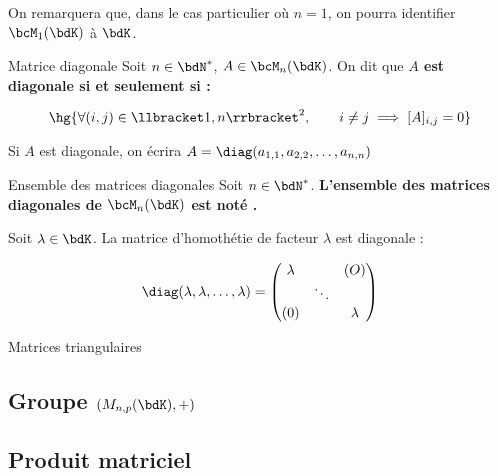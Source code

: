 \documentclass[a4paper,french,bookmarks]{article}
\begin{document}
On remarquera que, dans le cas particulier où $n = 1$, on pourra identifier $\bcM_1(\bdK)$ à $\bdK$.

\begin{definition}{Matrice diagonale}{}
    Soit $n \in \bdN^*$, $A \in \bcM_n(\bdK)$. On dit que \bf{$A$ est diagonale} si et seulement si :
    
    \[ \hg{\forall (i, j) \in \llbracket 1, n\rrbracket^2, \qquad i \neq j \implies [A]_{i, j} = 0}\]
\end{definition}

Si $A$ est diagonale, on écrira $A = \diag(a_{1, 1}, a_{2, 2}, \dots, a_{n, n})$

\begin{definition}{Ensemble des matrices diagonales}{}
    Soit $n \in \bdN^*$. \bf{L'ensemble des matrices diagonales} de $\bcM_n(\bdK)$ est noté .
\end{definition}

\begin{example}{}{}
    \begin{enumerate}
        \ithand 
        
        \ithand Soit $\lambda \in \bdK$. La matrice d'homothétie de facteur $\lambda$ est diagonale :
        
        \[\diag(\lambda, \lambda, \dots, \lambda) = \begin{pmatrix}
            \lambda & & (O) \\
            & \ddots & \\
            (0) & & \lambda
        \end{pmatrix}
        \]
    \end{enumerate}
\end{example}

Matrices triangulaires

\subsection{Groupe $(M_{n, p}(\bdK), +)$}

\subsection{Produit matriciel}
\end{document}
